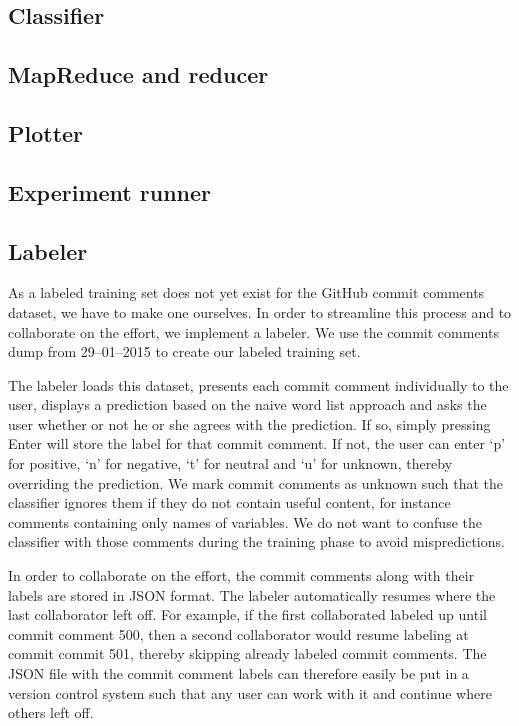 \documentclass{article}
\begin{document}
\subsection{Classifier}\label{sec:classifier}

\subsection{MapReduce and reducer}\label{sec:reducer}

\subsection{Plotter}\label{sec:plotter}

\subsection{Experiment runner}\label{sec:experiment_runner}

\subsection{Labeler}\label{sec:labeler}
As a labeled training set does not yet exist for the GitHub commit comments
dataset, we have to make one ourselves. In order to streamline this process
and to collaborate on the effort, we implement a labeler. We use the commit
comments dump from 29--01--2015 to create our labeled training set.

The labeler loads this dataset, presents each commit comment individually to
the user, displays a prediction based on the naive word list approach and asks
the user whether or not he or she agrees with the prediction. If so, simply
pressing Enter will store the label for that commit comment. If not, the user
can enter `p' for positive, `n' for negative, `t' for neutral and `u' for
unknown, thereby overriding the prediction. We mark commit comments as unknown
such that the classifier ignores them if they do not contain useful content,
for instance comments containing only names of variables. We do not want to
confuse the classifier with those comments during the training phase to avoid
mispredictions.

In order to collaborate on the effort, the commit comments along with their
labels are stored in JSON format. The labeler automatically resumes where
the last collaborator left off. For example, if the first collaborated labeled
up until commit comment 500, then a second collaborator would resume labeling
at commit commit 501, thereby skipping already labeled commit comments. The
JSON file with the commit comment labels can therefore easily be put in a
version control system such that any user can work with it and continue where
others left off.
\end{document}
